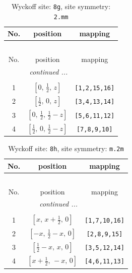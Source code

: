 \documentclass[fleqn,8pt]{jsarticle}
\begin{document}
\renewcommand{\arraystretch}{1.2}
\begin{longtable}{ccc}
\caption{Wyckoff site: {\tt 8g}, site symmetry: {\tt 2.mm}}
 \\
 \hline \hline
No. & position & mapping \\ \hline \endfirsthead

\multicolumn{2}{l}{\tablename\ \thetable{}} \\
 \hline \hline
No. & position & mapping \\ \hline \endhead

 \hline \hline
\multicolumn{2}{r}{\footnotesize\it continued ...} \\ \endfoot

 \hline \hline
\multicolumn{2}{r}{} \\ \endlastfoot

1 & $\left[ 0,\, \frac{1}{2},\, z \right]$ & {\tt [1,2,15,16]} \\ \hline
2 & $\left[ \frac{1}{2},\, 0,\, z \right]$ & {\tt [3,4,13,14]} \\ \hline
3 & $\left[ 0,\, \frac{1}{2},\, \frac{1}{2} - z \right]$ & {\tt [5,6,11,12]} \\ \hline
4 & $\left[ \frac{1}{2},\, 0,\, \frac{1}{2} - z \right]$ & {\tt [7,8,9,10]} \\
\end{longtable}
\renewcommand{\arraystretch}{1.2}
\begin{longtable}{ccc}
\caption{Wyckoff site: {\tt 8h}, site symmetry: {\tt m.2m}}
 \\
 \hline \hline
No. & position & mapping \\ \hline \endfirsthead

\multicolumn{2}{l}{\tablename\ \thetable{}} \\
 \hline \hline
No. & position & mapping \\ \hline \endhead

 \hline \hline
\multicolumn{2}{r}{\footnotesize\it continued ...} \\ \endfoot

 \hline \hline
\multicolumn{2}{r}{} \\ \endlastfoot

1 & $\left[ x,\, x + \frac{1}{2},\, 0 \right]$ & {\tt [1,7,10,16]} \\ \hline
2 & $\left[ - x,\, \frac{1}{2} - x,\, 0 \right]$ & {\tt [2,8,9,15]} \\ \hline
3 & $\left[ \frac{1}{2} - x,\, x,\, 0 \right]$ & {\tt [3,5,12,14]} \\ \hline
4 & $\left[ x + \frac{1}{2},\, - x,\, 0 \right]$ & {\tt [4,6,11,13]} \\
\end{longtable}
\end{document}
